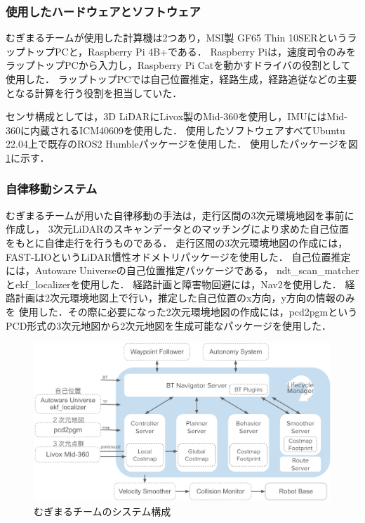 \documentclass[twocolumn,9pt]{jsproceedings}
\begin{document}
\subsubsection{使用したハードウェアとソフトウェア}

むぎまるチームが使用した計算機は2つあり，MSI製 GF65 Thin 10SERというラップトップPCと，Raspberry Pi 4B+である．
Raspberry Piは，速度司令のみをラップトップPCから入力し，Raspberry Pi Catを動かすドライバの役割として使用した．
ラップトップPCでは自己位置推定，経路生成，経路追従などの主要となる計算を行う役割を担当していた．

センサ構成としては，3D LiDARにLivox製のMid-360を使用し，IMUにはMid-360に内蔵されるICM40609を使用した．
使用したソフトウェアすべてUbuntu 22.04上で既存のROS2 Humbleパッケージを使用した．
使用したパッケージを図\ref{fig:mugimaru_system}に示す．

\subsubsection{自律移動システム}

むぎまるチームが用いた自律移動の手法は，走行区間の3次元環境地図を事前に作成し，
3次元LiDARのスキャンデータとのマッチングにより求めた自己位置
をもとに自律走行を行うものである．
走行区間の3次元環境地図の作成には，FAST-LIOというLiDAR慣性オドメトリパッケージを使用した．
自己位置推定には，Autoware Universeの自己位置推定パッケージである，
ndt\_scan\_matcherとekf\_localizerを使用した．
経路計画と障害物回避には，Nav2を使用した．
経路計画は2次元環境地図上で行い，推定した自己位置のx方向，y方向の情報のみを
使用した．その際に必要になった2次元環境地図の作成には，pcd2pgmという
PCD形式の3次元地図から2次元地図を生成可能なパッケージを使用した．

\begin{figure}[h]
  \begin{center}
    \includegraphics[width=1.0\linewidth]{figs/mugimaru_system.pdf}
    \caption{むぎまるチームのシステム構成}
    \label{fig:mugimaru_system}
  \end{center}
\end{figure}
\end{document}
